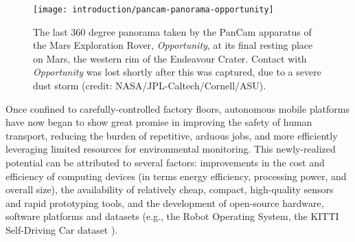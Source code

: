 \begin{figure}
  \begin{center}
  	\vspace{-10pt}
    \texttt{[image: introduction/pancam-panorama-opportunity]}
     \vspace{-15pt}
  \end{center}
  \caption{The last 360 degree panorama taken by the PanCam apparatus of the Mars Exploration Rover, \textit{Opportunity}, at its final resting place on Mars, the western rim of the Endeavour Crater. Contact with \textit{Opportunity} was lost shortly after this was captured, due to a severe dust storm (credit: NASA/JPL-Caltech/Cornell/ASU).}
  \vspace{-5pt}
  \label{fig:into_rur}
\end{figure}


Once confined to carefully-controlled factory floors, autonomous mobile platforms have now began to show great promise in improving the safety of human transport, reducing the burden of repetitive, arduous jobs, and more efficiently leveraging limited resources for environmental monitoring. This newly-realized potential can be attributed to several factors: improvements in the cost and efficiency of computing devices (in terms energy efficiency, processing power, and overall size), the availability of relatively cheap, compact, high-quality sensors and rapid prototyping tools, and the development of open-source hardware, software platforms and datasets (e.g., the Robot Operating System, the KITTI Self-Driving Car dataset \citep{Geiger2013-ky}). 

